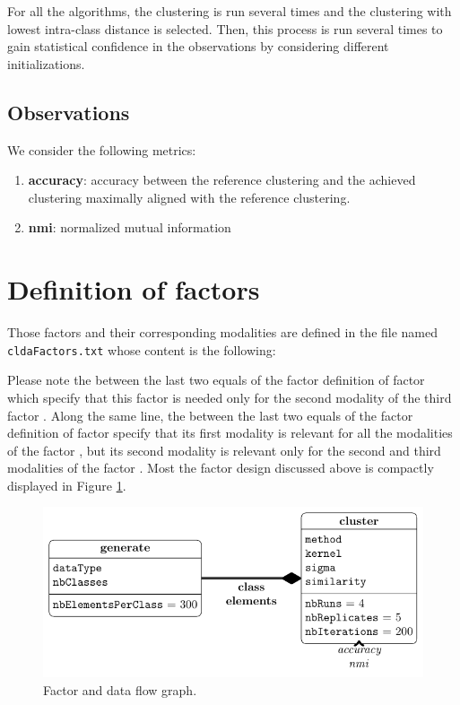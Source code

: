 \documentclass[12pt,a4paper,fleqn]{tufte-handout}
\begin{document}
For all the algorithms, the clustering is run several times and the clustering with lowest intra-class distance is selected. Then, this process is run several times to gain statistical confidence in the observations by considering different initializations.

\subsection{Observations}

We consider the following metrics:
\begin{enumerate}
\item \textbf{accuracy}: accuracy between the reference clustering and the achieved clustering maximally aligned with the reference clustering.
\item \textbf{nmi}: normalized mutual information
\end{enumerate}

\section{Definition of factors}

Those factors and their corresponding modalities are defined in the file named \texttt{cldaFactors.txt} whose content is the following:


Please note the  between the last two equals of the factor definition of factor  which specify that this factor is needed only for the second modality of the third factor . Along the same line, the  between the last two equals of the factor definition of factor   specify that its first modality is relevant for all the modalities of the factor , but its second modality is relevant only for the second and third modalities of the factor . Most the factor design discussed above is compactly displayed in Figure \ref{factorFlowGraph}.

\begin{figure}
\includegraphics[width=\textwidth]{figures/factors}
\caption{Factor and data flow graph.}
\label{factorFlowGraph}
\end{figure}
\end{document}
